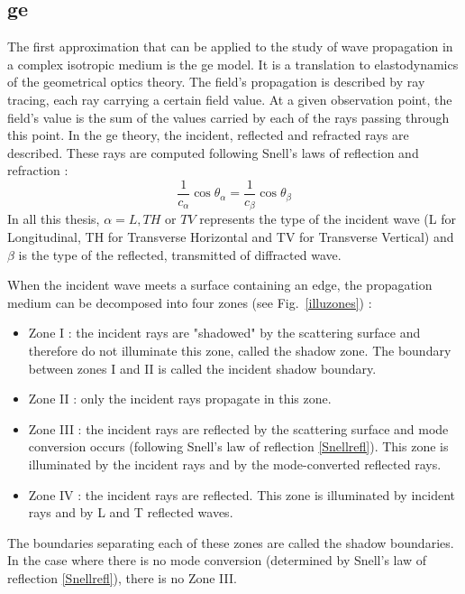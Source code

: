 \subsection{\acrfull{ge}}
\label{sectGE}
The first approximation that can be applied to the study of wave propagation in a complex isotropic medium is the \acrfull{ge} model. It is a translation to elastodynamics of the geometrical optics theory. The field's propagation is described by ray tracing, each ray carrying a certain field value. At a given observation point, the field's value is the sum of the values carried by each of the rays passing through this point. In the \acrshort{ge} theory, the incident, reflected and refracted rays are described. These rays are computed following Snell's laws of reflection and refraction :
\begin{equation}
    \frac{1}{c_{\alpha}}\cos\theta_{\alpha} = \frac{1}{c_{\beta}} \cos\theta_{\beta}
    \label{Snellrefl}
\end{equation}
In all this thesis, $\alpha=L,TH$ or $TV$ represents the type of the incident wave (L for Longitudinal, TH for Transverse Horizontal and TV for Transverse Vertical) and $\beta$ is the type of the reflected, transmitted of diffracted wave.

When the incident wave meets a surface containing an edge, the propagation medium can be decomposed into four zones (see Fig.~\ref{illuzones}) :
\begin{itemize}
	\item Zone I : the incident rays are "shadowed" by the scattering surface and therefore do not illuminate this zone, called the shadow zone. The boundary between zones I and II is called the incident shadow boundary.
    \item Zone II : only the incident rays propagate in this zone.
    \item Zone III :  the incident rays are reflected by the scattering surface and mode conversion occurs (following Snell's law of reflection \eqref{Snellrefl}). This zone is illuminated by the incident rays and by the mode-converted reflected rays.
    \item Zone IV : the incident rays are reflected. This zone is illuminated by incident rays and by L and T reflected waves.
\end{itemize}

The boundaries separating each of these zones are called the shadow boundaries. In the case where there is no mode conversion (determined by Snell's law of reflection \eqref{Snellrefl}), there is no Zone III. 

